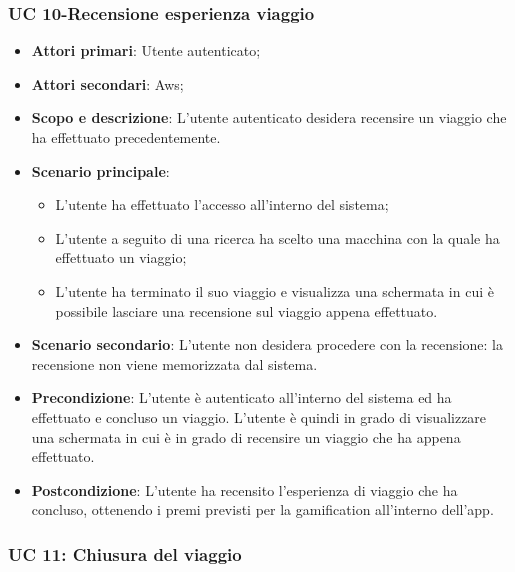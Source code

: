             
       
     
       \subsubsection{UC 10-Recensione esperienza viaggio}
       \begin{itemize}
        \item \textbf{Attori primari}: Utente autenticato;
        \item \textbf{Attori secondari}: Aws;
        \item \textbf{Scopo e descrizione}: L'utente autenticato desidera recensire un viaggio che ha effettuato precedentemente.
        \item \textbf{Scenario principale}:
            \begin{itemize}
                \item L'utente ha effettuato l'accesso all'interno del sistema;
                \item L'utente a seguito di una ricerca ha scelto una macchina con la quale ha effettuato un viaggio;
                \item L'utente ha terminato il suo viaggio e visualizza una schermata in cui è possibile lasciare una recensione sul viaggio appena effettuato.
            \end{itemize}
        
        \item \textbf{Scenario secondario}: L'utente non desidera procedere con la recensione: la recensione non viene memorizzata dal sistema.
       
        
        \item \textbf{Precondizione}: L'utente è autenticato all'interno del sistema ed ha effettuato e concluso un viaggio. L'utente è quindi in grado di visualizzare una schermata in cui è in grado di recensire un viaggio che ha appena effettuato.
        \item \textbf{Postcondizione}: L'utente ha recensito l'esperienza di viaggio che ha concluso, ottenendo i premi previsti per la gamification all'interno dell'app.
        \end{itemize}  
      
      
       \subsubsection{UC 11: Chiusura del viaggio}
  
